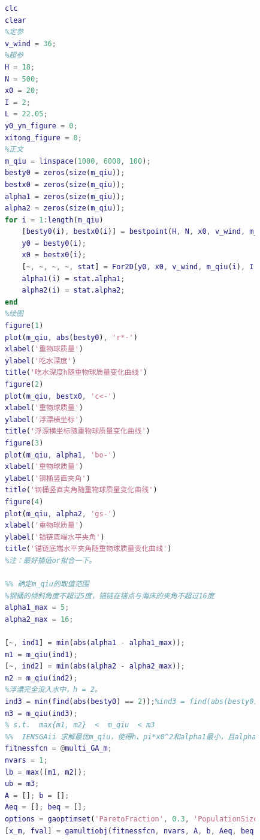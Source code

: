             \begin{lstlisting}[language = Matlab]
            %% 绘制m_qiu和y0 、x0 、alpha1、alpha2之间的关系图
            clc
            clear
            %定参
            v_wind = 36;
            %超参
            H = 18;
            N = 500;
            x0 = 20;
            I = 2;
            L = 22.05;
            y0_yn_figure = 0;
            xitong_figure = 0;
            %正文
            m_qiu = linspace(1000, 6000, 100);
            besty0 = zeros(size(m_qiu));
            bestx0 = zeros(size(m_qiu));
            alpha1 = zeros(size(m_qiu));
            alpha2 = zeros(size(m_qiu));
            for i = 1:length(m_qiu)
                [besty0(i), bestx0(i)] = bestpoint(H, N, x0, v_wind, m_qiu(i), I, L, y0_yn_figure);
                y0 = besty0(i);
                x0 = bestx0(i);
                [~, ~, ~, ~, stat] = For2D(y0, x0, v_wind, m_qiu(i), I, L, xitong_figure);
                alpha1(i) = stat.alpha1;
                alpha2(i) = stat.alpha2;
            end
            %绘图
            figure(1)
            plot(m_qiu, abs(besty0), 'r*-')
            xlabel('重物球质量')
            ylabel('吃水深度')
            title('吃水深度h随重物球质量变化曲线')
            figure(2)
            plot(m_qiu, bestx0, 'c<-')
            xlabel('重物球质量')
            ylabel('浮漂横坐标')
            title('浮漂横坐标随重物球质量变化曲线')
            figure(3)
            plot(m_qiu, alpha1, 'bo-')
            xlabel('重物球质量')
            ylabel('钢桶竖直夹角')
            title('钢桶竖直夹角随重物球质量变化曲线')
            figure(4)
            plot(m_qiu, alpha2, 'gs-')
            xlabel('重物球质量')
            ylabel('锚链底端水平夹角')
            title('锚链底端水平夹角随重物球质量变化曲线')
            %注：最好插值or拟合一下。

            %% 确定m_qiu的取值范围
            %钢桶的倾斜角度不超过5度，锚链在锚点与海床的夹角不超过16度
            alpha1_max = 5;
            alpha2_max = 16;

            [~, ind1] = min(abs(alpha1 - alpha1_max));
            m1 = m_qiu(ind1);
            [~, ind2] = min(abs(alpha2 - alpha2_max));
            m2 = m_qiu(ind2);
            %浮漂完全没入水中，h = 2。
            ind3 = min(find(abs(besty0) == 2));%ind3 = find(abs(besty0) == 2, 1)
            m3 = m_qiu(ind3);
            % s.t.  max{m1, m2}  <  m_qiu  < m3
            %%  IENSGAii 求解最优m_qiu，使得h、pi*x0^2和alpha1最小，且alpha1，2在范围内
            fitnessfcn = @multi_GA_m;
            nvars = 1;
            lb = max([m1, m2]);
            ub = m3;
            A = []; b = [];
            Aeq = []; beq = [];
            options = gaoptimset('ParetoFraction', 0.3, 'PopulationSize', 100, 'Generations', 100, 'StallGenLimit', 100, 'PlotFcns', {@gaplotpareto, @gaplotbestf});
            [x_m, fval] = gamultiobj(fitnessfcn, nvars, A, b, Aeq, beq, lb, ub, options);
            \end{lstlisting}




